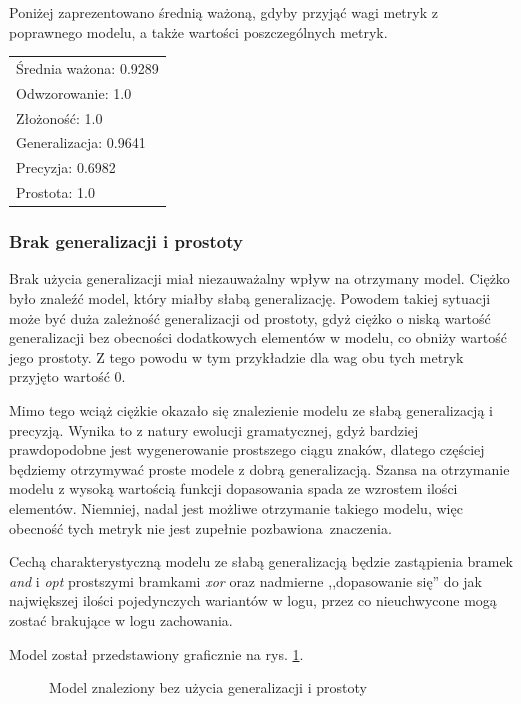 Poniżej zaprezentowano średnią ważoną, gdyby przyjąć wagi metryk z poprawnego modelu, a także wartości poszczególnych metryk. 
 \begin{center}
  \begin{tabular}{l}
	Średnia ważona: 0.9289 \\
	Odwzorowanie: 1.0 \\
	Złożoność: 1.0 \\
	Generalizacja: 0.9641 \\
	Precyzja: 0.6982 \\
	Prostota: 1.0
  \end{tabular}
 \end{center}
 
\subsubsection{Brak generalizacji i prostoty}
\label{sec:no-generalization-and-simplicity}
Brak użycia generalizacji miał niezauważalny wpływ na otrzymany model. Ciężko było znaleźć model, który miałby słabą generalizację. Powodem takiej sytuacji może być duża zależność generalizacji od prostoty, gdyż ciężko o niską wartość generalizacji bez obecności dodatkowych elementów w modelu, co obniży wartość jego prostoty. Z tego powodu w tym przykładzie dla wag obu tych metryk przyjęto wartość 0.

Mimo tego wciąż ciężkie okazało się znalezienie modelu ze słabą generalizacją i precyzją. Wynika to z natury ewolucji gramatycznej, gdyż bardziej prawdopodobne jest wygenerowanie prostszego ciągu znaków, dlatego częściej będziemy otrzymywać proste modele z dobrą generalizacją. Szansa na otrzymanie modelu z wysoką wartością funkcji dopasowania spada ze wzrostem ilości elementów. Niemniej, nadal jest możliwe otrzymanie takiego modelu, więc obecność tych metryk nie jest zupełnie pozbawiona~znaczenia.

Cechą charakterystyczną modelu ze słabą generalizacją będzie zastąpienia bramek \textit{and} i \textit{opt} prostszymi bramkami \textit{xor} oraz nadmierne ,,dopasowanie się'' do jak największej ilości pojedynczych wariantów w logu, przez co nieuchwycone mogą zostać brakujące w logu zachowania.

Model został przedstawiony graficznie na rys. \ref{fig:no-generalization-and-simplicity}.

\begin{figure}[H]
	\caption{\label{fig:no-generalization-and-simplicity}Model znaleziony bez użycia generalizacji i prostoty}
\end{figure}

